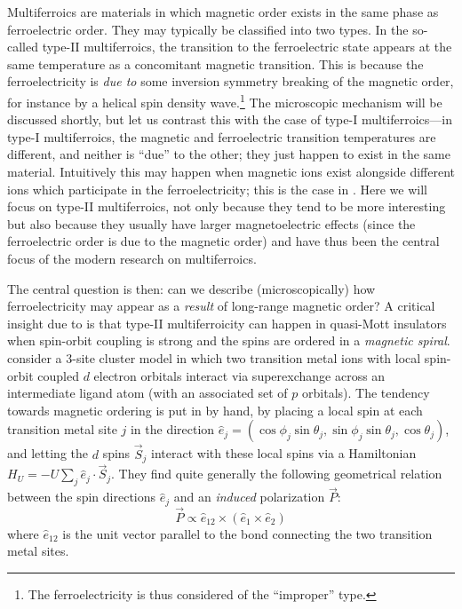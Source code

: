 Multiferroics are materials in which magnetic order exists in the same phase as ferroelectric order.
They may typically be classified into two types.
In the so-called type-II multiferroics, the transition to the ferroelectric state appears at the same temperature as a concomitant magnetic transition.
This is because the ferroelectricity is \emph{due to} some inversion symmetry breaking of the magnetic order, for instance by a helical spin density wave.\footnote{The ferroelectricity is thus considered of the ``improper'' type.}
The microscopic mechanism will be discussed shortly, but let us contrast this with the case of type-I multiferroics---in type-I multiferroics, the magnetic and ferroelectric transition temperatures are different, and neither is ``due'' to the other; they just happen to exist in the same material.
Intuitively this may happen when magnetic ions exist alongside different ions which participate in the ferroelectricity; this is the case in \cite{kiselev_detection_1963}.
Here we will focus on type-II multiferroics, not only because they tend to be more interesting but also because they usually have larger magnetoelectric effects (since the ferroelectric order is due to the magnetic order) and have thus been the central focus of the modern research on multiferroics.

The central question is then: can we describe (microscopically) how ferroelectricity may appear as a \emph{result} of long-range magnetic order?
A critical insight due to \citet{katsura_spin_2005} is that type-II multiferroicity can happen in quasi-\oned Mott insulators when spin-orbit coupling is strong and the spins are ordered in a \emph{magnetic spiral}.
\citet{katsura_spin_2005} consider a \num{3}-site \oned cluster model in which two transition metal ions with local spin-orbit coupled $d$ electron orbitals interact via superexchange across an intermediate ligand atom (with an associated set of $p$ orbitals).
The tendency towards magnetic ordering is put in by hand, by placing a local spin at each transition metal site $j$ in the direction $\hat{e}_j = (\cos\phi_j \sin\theta_j, \sin\phi_j \sin\theta_j, \cos\theta_j)$, and letting the $d$ spins $\vec{S}_j$ interact with these local spins via a Hamiltonian $H_U=-U\sum_j \hat{e}_j\cdot \vec{S}_j$.
They find quite generally the following geometrical relation between the spin directions $\hat{e}_j$ and an \emph{induced} polarization $\vec{P}$:
\begin{equation}\label{eq:knbtheoryequation}
\vec{P} \propto \hat{e}_{12}\times(\hat{e}_1\times\hat{e}_2)
\end{equation}
where $\hat{e}_{12}$ is the unit vector parallel to the bond connecting the two transition metal sites.

